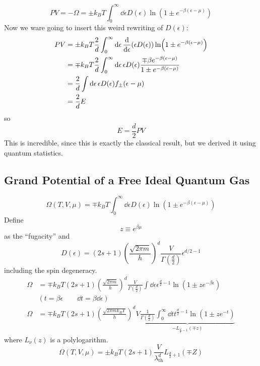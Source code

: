 \documentclass[a4paper,twoside,master.tex]{subfiles}
\begin{document}
\begin{equation}
    PV = - \Omega = \pm k_B T \int_0^{\infty} \dd{\epsilon} D(\epsilon) \ln(1 \pm e^{- \beta (\epsilon - \mu)}) 
\end{equation}
Now we ware going to insert this weird rewriting of $ D(\epsilon) $:
\begin{align}
    PV &= \pm k_B T \frac{2}{d} \int_0^{\infty} \dd{\epsilon} \dv{\epsilon}(\epsilon D(\epsilon)) \ln(1 \pm e^{- \beta (\epsilon - \mu)}) \\
    &= \mp k_B T \frac{2}{d} \int_{0}^{\infty} \dd{\epsilon} \epsilon D(\epsilon) \frac{\mp \beta e^{- \beta (\epsilon - \mu)}}{1 \pm e^{- \beta(\epsilon - \mu)}} \\
    &= \frac{2}{d} \int \dd{\epsilon} \epsilon D(\epsilon) f_{\pm}(\epsilon - \mu) \\
    &= \frac{2}{d} E
\end{align}
so
\begin{equation}
    E = \frac{d}{2} PV
\end{equation}
This is incredible, since this is exactly the classical result, but we derived it using quantum statistics.


\subsection{Grand Potential of a Free Ideal Quantum Gas}
\label{sub:grand_potential_of_a_free_ideal_quantum_gas}

\begin{equation}
    \Omega(T,V, \mu) = \mp k_B T \int_0^{\infty} \dd{\epsilon} D(\epsilon) \ln(1 \pm e^{- \beta(\epsilon - \mu)})
\end{equation}
Define
\begin{equation}
    z\equiv e^{\beta \mu}
\end{equation}
as the ``fugacity'' and
\begin{equation}
    D(\epsilon) = (2s+1) \left( \frac{\sqrt{2 \pi m}}{h} \right)^d \frac{V}{\Gamma \left( \frac{d}{2} \right)} \epsilon^{d/2-1}
\end{equation}
including the spin degeneracy.
\begin{align}
    \Omega &= \mp k_B T (2s+1)\left( \frac{\sqrt{2 \pi m}}{h} \right)^d \frac{V}{\Gamma \left( \frac{d}{2} \right)} \int \dd{\epsilon} \epsilon^{\frac{d}{2} - 1} \ln(1 \pm z e^{- \beta \epsilon}) \\
    &\left( t = \beta \epsilon \qquad \dd{t} = \beta \dd{\epsilon} \right)\\
    \Omega &= \mp k_B T (2s+1) \left( \frac{\sqrt{2 \pi m k_B T}}{h} \right)^d V \underbrace{\frac{1}{\Gamma \left( \frac{d}{2} \right)} \int_0^{\infty} \dd{t} t^{\frac{d}{2} - 1} \ln(1 \pm z e^{- t})}_{-L_{\frac{d}{2} - 1} (\mp z)}
\end{align}
where $ L_{\nu}(z) $ is a polylogarithm.
\begin{equation}
    \Omega(T, V, \mu) = \pm k_B T(2s+1) \frac{V}{\lambda_{\text{th}}^d} L_{\frac{d}{2}+1}(\mp Z)
\end{equation}
\end{document}
